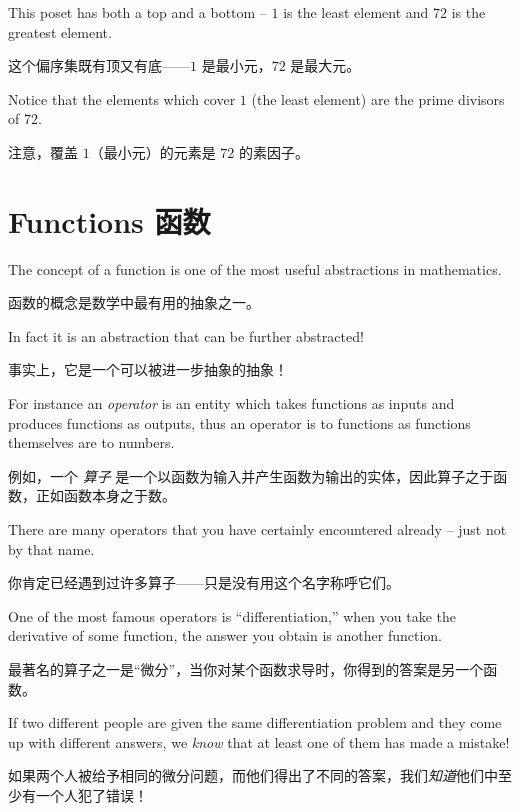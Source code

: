 This poset has both a top and a bottom -- $1$ is the least element
and $72$ is the greatest element.

这个偏序集既有顶又有底——$1$ 是最小元，$72$ 是最大元。

Notice that the elements which cover
$1$ (the least element) are the prime divisors of $72$.

注意，覆盖 $1$（最小元）的元素是 $72$ 的素因子。

\newpage





\newpage

\section{Functions 函数}
\label{sec:functions}

The concept of a function is one of the most useful abstractions
in mathematics.

函数的概念是数学中最有用的抽象之一。

In fact it is an abstraction that can be further
abstracted!

事实上，它是一个可以被进一步抽象的抽象！

For instance an \emph{operator} 
is an entity which takes functions as inputs and produces functions
as outputs, thus an operator is to functions as functions themselves
are to numbers.

例如，一个 \emph{算子} 是一个以函数为输入并产生函数为输出的实体，因此算子之于函数，正如函数本身之于数。

There are many operators that you have certainly
encountered already -- just not by that name.

你肯定已经遇到过许多算子——只是没有用这个名字称呼它们。

One of the most
famous operators is ``differentiation,'' when you take the derivative
of some function, the answer you obtain is another function.

最著名的算子之一是“微分”，当你对某个函数求导时，你得到的答案是另一个函数。

If two different people are given the same differentiation problem
and they come up with different answers, we \emph{know} that at least
one of them has made a mistake!

如果两个人被给予相同的微分问题，而他们得出了不同的答案，我们\emph{知道}他们中至少有一个人犯了错误！


